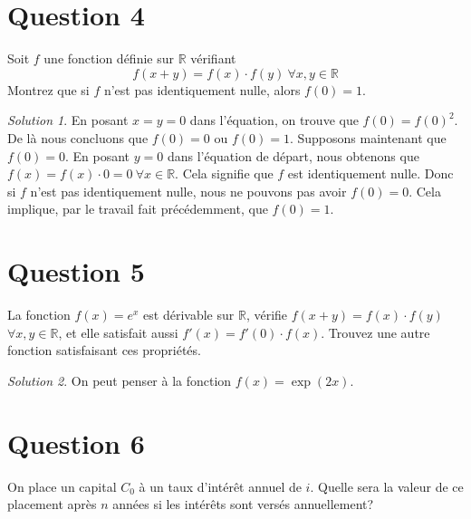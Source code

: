 \documentclass[
  12pt,
  letterpaper,
]{book}
\theoremstyle{remark}
\newtheorem*{solution}{Solution}
\begin{document}
\hypertarget{question-4}{%
\section{Question 4}\label{question-4}}

Soit \(f\) une fonction définie sur \(\mathbb{R}\) vérifiant
\[f(x+y)=f(x)\cdot f(y)~\forall x,y\in\mathbb{R}\] Montrez que si \(f\)
n'est pas identiquement nulle, alors \(f(0)=1\).

\begin{solution}

En posant \(x=y=0\) dans l'équation, on trouve que \(f(0)=f(0)^2\). De
là nous concluons que \(f(0)=0\) ou \(f(0)=1\). Supposons maintenant que
\(f(0)=0\). En posant \(y=0\) dans l'équation de départ, nous obtenons
que \(f(x)=f(x)\cdot 0=0~\forall x\in\mathbb{R}\). Cela signifie que
\(f\) est identiquement nulle. Donc si \(f\) n'est pas identiquement
nulle, nous ne pouvons pas avoir \(f(0)=0\). Cela implique, par le
travail fait précédemment, que \(f(0)=1\).

\end{solution}

\hypertarget{question-5}{%
\section{Question 5}\label{question-5}}

La fonction \(f(x)=e^x\) est dérivable sur \(\mathbb{R}\), vérifie
\(f(x+y)=f(x)\cdot f(y)\) \(\forall x,y\in\mathbb{R}\), et elle
satisfait aussi \(f'(x)=f'(0)\cdot f(x).\) Trouvez une autre fonction
satisfaisant ces propriétés.

\begin{solution}

On peut penser à la fonction \(f(x)=\exp(2x)\).

\end{solution}

\hypertarget{question-6}{%
\section{Question 6}\label{question-6}}

On place un capital \(C_0\) à un taux d'intérêt annuel de \(i%
\). Quelle sera la valeur de ce placement après \(n\) années si les
intérêts sont versés annuellement?
\end{document}
